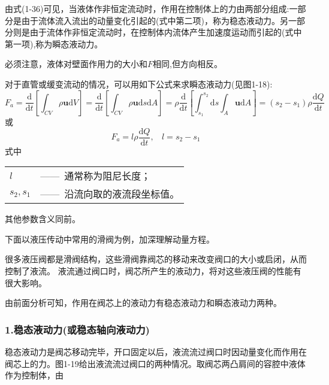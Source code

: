由式(1-36)可见，当液体作非恒定流动时，作用在控制体上的力由两部分组成:一部分是由于流体流入流出的动量变化引起的(式中第二项)，称为稳态液动力。另一部分则是由于流体作非恒定流动时，在控制体内流体产生加速度运动而引起的(式中第一项),称为瞬态液动力。

必须注意，液体对壁面作用力的大小和$F$相同,但方向相反。

对于直管或缓变流动的情况，可以用如下公式来求瞬态液动力(见图1-18):
\begin{equation*}
 F_a=\frac{\mathrm{d}}{\mathrm{d}t}[\int_{CV}\rho {\boldsymbol u} \mathrm{d}V]=\frac{\mathrm{d}}{\mathrm{d}t}[\int_{CV}\rho {\boldsymbol u} \mathrm{d}s\mathrm{d}A]
 =\rho\frac{\mathrm{d}}{\mathrm{d}t}[\int_{s_1}^{s_2}\mathrm{d}s\int_A\boldsymbol u\mathrm{d}A]=(s_2-s_1)\rho\frac{\mathrm{d}Q}{\mathrm{d}t}
\end{equation*}
或
\begin{equation}
  F_a=l\rho\frac{\mathrm{d}Q}{\mathrm{d}t},\ \ \ \ l=s_2-s_1
\end{equation}
\noindent 式中\
\begin{tabular}[t]{ll}
\qquad$l$ &——\ 通常称为阻尼长度；\\
$s_2,s_1$ &——\ 沿流向取的液流段坐标值。
\end{tabular}

其他参数含义同前。

下面以液压传动中常用的滑阀为例，加深理解动量方程。

很多液压阀都是滑阀结构，这些滑阀靠阀芯的移动来改变阀口的大小或启闭，从而控制了液流。
液流通过阀口时，阀芯所产生的液动力，将对这些液压阀的性能有很大影响。

由前面分析可知，作用在阀芯上的液动力有稳态液动力和瞬态液动力两种。

\subsubsection*{1.稳态液动力(或稳态轴向液动力)}

稳态液动力是阀芯移动完毕，开口固定以后，液流流过阀口时因动量变化而作用在阀芯上的力。图1-19给出液流流过阀口的两种情况。取阀芯两凸肩间的容腔中液体作为控制体，由